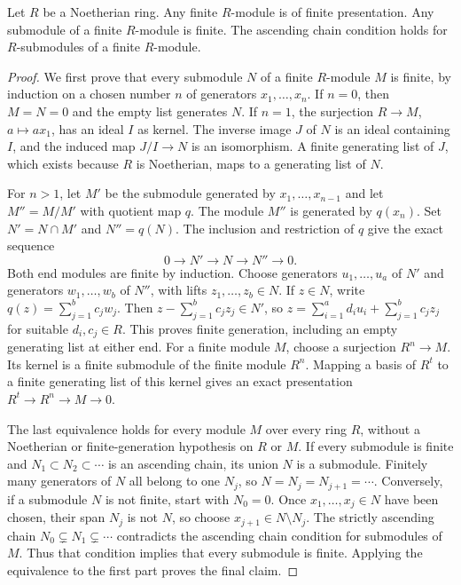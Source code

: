 \begin{lemma}
\label{editorial-source-lemma-Noetherian-basic}
Let $R$ be a Noetherian ring.
Any finite $R$-module is of finite presentation.
Any submodule of a finite $R$-module is finite.
The ascending chain condition holds for $R$-submodules
of a finite $R$-module.
\end{lemma}

\begin{proof}
We first prove that every submodule $N$ of a finite $R$-module
$M$ is finite, by induction on a chosen number $n$ of generators
$x_1,\ldots,x_n$. If $n=0$, then $M=N=0$ and the empty list
generates $N$. If $n=1$, the surjection $R\to M$, $a\mapsto ax_1$,
has an ideal $I$ as kernel. The inverse image $J$ of $N$ is an
ideal containing $I$, and the induced map $J/I\to N$ is an
isomorphism. A finite generating list of $J$, which exists because
$R$ is Noetherian, maps to a generating list of $N$.

For $n>1$, let $M'$ be the submodule generated by
$x_1,\ldots,x_{n-1}$ and let $M''=M/M'$ with quotient map $q$.
The module $M''$ is generated by $q(x_n)$.
Set $N'=N\cap M'$ and $N''=q(N)$. The inclusion and restriction
of $q$ give the exact sequence
$$
0\longrightarrow N'\longrightarrow N\longrightarrow N''
\longrightarrow0.
$$
Both end modules are finite by induction. Choose generators
$u_1,\ldots,u_a$ of $N'$ and generators
$w_1,\ldots,w_b$ of $N''$, with lifts
$z_1,\ldots,z_b\in N$. If $z\in N$, write
$q(z)=\sum_{j=1}^b c_jw_j$. Then
$z-\sum_{j=1}^b c_jz_j\in N'$, so
$z=\sum_{i=1}^a d_i u_i+\sum_{j=1}^b c_jz_j$ for suitable
$d_i,c_j\in R$. This proves finite generation, including an
empty generating list at either end.
For a finite module $M$, choose a surjection $R^n\to M$.
Its kernel is a finite submodule of the finite module $R^n$.
Mapping a basis of $R^t$ to a finite generating list of this
kernel gives an exact presentation $R^t\to R^n\to M\to0$.

The last equivalence holds for every module $M$ over every ring
$R$, without a Noetherian or finite-generation hypothesis on
$R$ or $M$. If every submodule is finite and
$N_1\subset N_2\subset\cdots$ is an ascending chain,
its union $N$ is a submodule. Finitely many generators of $N$
all belong to one $N_j$, so $N=N_j=N_{j+1}=\cdots$.
Conversely, if a submodule $N$ is not finite, start with
$N_0=0$. Once $x_1,\ldots,x_j\in N$ have been chosen, their
span $N_j$ is not $N$, so choose $x_{j+1}\in N\setminus N_j$.
The strictly ascending chain $N_0\subsetneq N_1\subsetneq\cdots$
contradicts the ascending chain condition for submodules of $M$.
Thus that condition implies that every submodule is finite.
Applying the equivalence to the first part proves the final claim.
\end{proof}